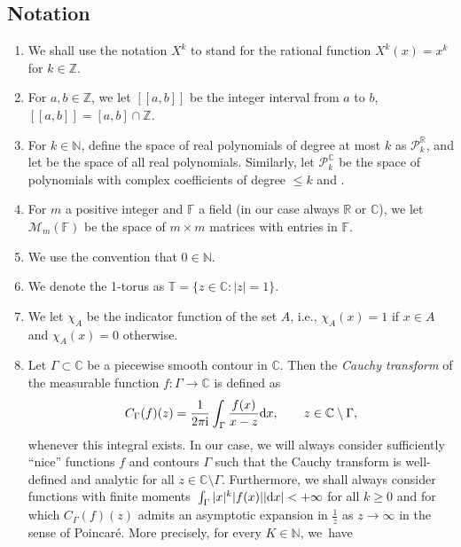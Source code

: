 \documentclass[pdftex]{sigma}
\numberwithin{equation}{section}
\begin{document}
\subsection{Notation}
\begin{enumerate}\itemsep=0pt
\item[(1)] We shall use the notation $\mathit{X}^k$ to stand for the rational function $\mathit{X}^k(x) = x^k$ for $k \in \mathbb{Z}$.
\item[(2)] For $a,b \in \mathbb{Z}$, we let $[\![a,b]\!]$ be the integer interval from $a$ to $b$, $[\![a,b]\!] = [a,b] \cap \mathbb{Z}$.
\item[(3)] For $k \in \mathbb{N}$, define the space of real polynomials of degree at most $k$ as
$\mathscr{P}_{k}^\mathbb{R}$, and let
 be the space of all real polynomials. Similarly, let $\mathscr{P}^\mathbb{C}_k$ be the space of polynomials with complex coefficients of degree $\leq k$ and .
\item[(4)] For $m$ a positive integer and $\mathbb{F}$ a field (in our case always $\mathbb{R}$ or $\mathbb{C}$), we let $\mathcal{M}_m (\mathbb{F})$ be the space of $m \times m$ matrices with entries in $\mathbb{F}$.
\item[(5)] We use the convention that $0 \in \mathbb{N}$.
\item[(6)] We denote the 1-torus as $\mathbb{T} = \{ z \in \mathbb{C} \colon |z|=1 \}$.
\item[(7)] We let $\chi_A$ be the indicator function of the set $A$, i.e., $\chi_A(x) = 1$ if $x \in A$ and $\chi_A(x) = 0$ otherwise.
\item[(8)] Let $\Gamma \subset \mathbb{C}$ be a piecewise smooth contour in $\mathbb{C}$. Then the \textit{Cauchy transform} of the measurable function $f\colon \Gamma \longrightarrow \mathbb{C}$ is defined as
\[
C_\Gamma (f) (z) = \frac{1}{2\pi {\rm i}}\int_\Gamma \frac{f(x)}{x-z} {\rm d}x,\qquad z \in \mathbb{C}\setminus \Gamma,
\]
whenever this integral exists. In our case, we will always consider sufficiently \enquote{nice} functions $f$ and contours $\Gamma$ such that the Cauchy transform is well-defined and analytic for all $z \in \mathbb{C}\setminus \Gamma$. Furthermore, we shall always consider functions with finite moments~${\int_\Gamma |x|^k |f(x)| |{\rm d}x| < +\infty}$ for all $k\geq 0$ and for which $C_\Gamma (f)(z)$ admits an asymptotic expansion in $\frac{1}{z}$ as $z \to \infty$ in the sense of Poincar\'e. More precisely, for every $K \in \mathbb{N}$, we~have

\end{enumerate}
\end{document}
